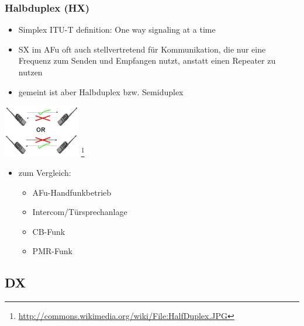 \begin{frame}
    \frametitle{Halbduplex (HX)}

    \begin{itemize}
        \item Simplex ITU-T definition: One way signaling at a time
        \item SX im AFu oft auch stellvertretend für Kommunikation, die nur eine Frequenz
              zum Senden und Empfangen nutzt, anstatt einen Repeater zu nutzen
        \item gemeint ist aber Halbduplex bzw. Semiduplex
    \end{itemize}

    \begin{center}
        \includegraphics[width=0.25\textwidth,height=.25\textheight,keepaspectratio]{bv11/HalfDuplex.jpg}
        \footnote{\tiny \url{http://commons.wikimedia.org/wiki/File:HalfDuplex.JPG}}
    \end{center}

    \begin{itemize}
      \item zum Vergleich:
      \begin{itemize}
         \item AFu-Handfunkbetrieb
         \item Intercom/Türsprechanlage
         \item CB-Funk
         \item PMR-Funk
      \end{itemize}
    \end{itemize}

\end{frame}

\subsection{DX}

